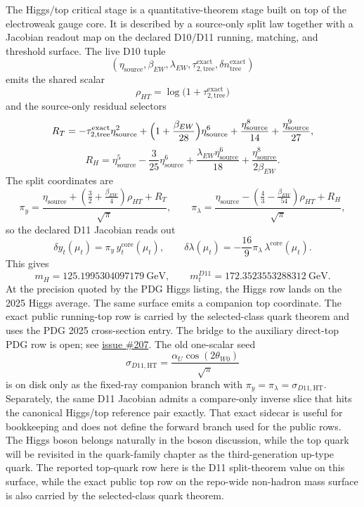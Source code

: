 \documentclass[11pt]{article}
\begin{document}
The Higgs/top critical stage is a quantitative-theorem stage built on top of the electroweak gauge core.
It is described by a source-only split law together with a Jacobian readout map on the declared D10/D11 running, matching, and threshold surface. The live D10 tuple
\[
(\eta_{\mathrm{source}},\beta_{EW},\lambda_{EW},\tau_{2,\mathrm{tree}}^{\mathrm{exact}},\delta n_{\mathrm{tree}}^{\mathrm{exact}})
\]
emits the shared scalar
\[
\rho_{HT}=\log\!\bigl(1+\tau_{2,\mathrm{tree}}^{\mathrm{exact}}\bigr)
\]
and the source-only residual selectors
\[
R_T=
-\tau_{2,\mathrm{tree}}^{\mathrm{exact}}\eta_{\mathrm{source}}^2
+\Bigl(1+\frac{\beta_{EW}}{28}\Bigr)\eta_{\mathrm{source}}^6
+\frac{\eta_{\mathrm{source}}^8}{14}
+\frac{\eta_{\mathrm{source}}^9}{27},
\]
\[
R_H=
\eta_{\mathrm{source}}^5
-\frac{3}{25}\eta_{\mathrm{source}}^6
+\frac{\lambda_{EW}\eta_{\mathrm{source}}^6}{18}
+\frac{\eta_{\mathrm{source}}^8}{2\beta_{EW}}.
\]
The split coordinates are
\[
\pi_y=
\frac{\eta_{\mathrm{source}}+\left(\frac32+\frac{\beta_{EW}}4\right)\rho_{HT}+R_T}{\sqrt{\pi}},
\qquad
\pi_\lambda=
\frac{\eta_{\mathrm{source}}-\left(\frac43-\frac{\beta_{EW}}{54}\right)\rho_{HT}+R_H}{\sqrt{\pi}},
\]
so the declared D11 Jacobian reads out
\[
\delta y_t(\mu_t)=\pi_y\,y_t^{\mathrm{core}}(\mu_t),
\qquad
\delta\lambda(\mu_t)=-\frac{16}{9}\pi_\lambda\,\lambda^{\mathrm{core}}(\mu_t).
\]
This gives
\[
m_H = 125.1995304097179~\mathrm{GeV},
\qquad
m_t^{D11} = 172.3523553288312~\mathrm{GeV}.
\]
At the precision quoted by the PDG Higgs listing, the Higgs row lands on the 2025 Higgs average. The
same surface emits a companion top coordinate. The exact public running-top row is carried by the
selected-class quark theorem and uses the PDG 2025 cross-section entry. The bridge to the auxiliary
direct-top PDG row is open; see \href{https://github.com/FloatingPragma/observer-patch-holography/issues/207}{issue \#207}.
The old one-scalar seed
\[
\sigma_{D11,\mathrm{HT}}=\frac{\alpha_U\cos(2\theta_{W0})}{\sqrt{\pi}}
\]
is on disk only as the fixed-ray companion branch with \(\pi_y=\pi_\lambda=\sigma_{D11,\mathrm{HT}}\).
Separately, the same D11 Jacobian admits a compare-only inverse slice that hits the canonical
Higgs/top reference pair exactly. That exact sidecar is useful for bookkeeping and does not define
the forward branch used for the public rows.
The Higgs boson belongs naturally in the boson discussion, while the top quark will be revisited
in the quark-family chapter as the third-generation up-type quark. The reported top-quark row here is
the D11 split-theorem value on this surface, while the exact public top row on the repo-wide non-hadron mass surface is also carried by the selected-class quark theorem.
\end{document}
